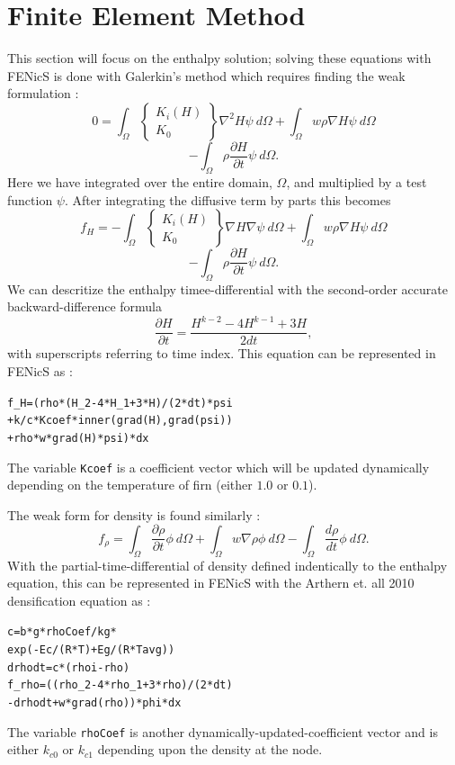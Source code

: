 \documentclass{article}%
\begin{document}
\section{Finite Element Method}

This section will focus on the enthalpy solution; solving these equations with FENicS is done with Galerkin's method which requires finding the weak formulation :
  $$
    0 =
    \int_{\Omega} 
      \begin{Bmatrix}
        K_i(H)\\
        K_0
      \end{Bmatrix}
      \nabla^2 H \psi\ d \Omega 
    + \int_{\Omega}w \rho \nabla H \psi\ d \Omega
  $$
  $$
    - \int_{\Omega} {\rho \frac{\partial H}{\partial t}} \psi\ d \Omega.
  $$
Here we have integrated over the entire domain, $\Omega$, and multiplied by a test function $\psi$.  After integrating the diffusive term by parts this becomes
  $$
    f_H =
    - \int_{\Omega} 
        \begin{Bmatrix}
          K_i(H)\\
          K_0
        \end{Bmatrix}
        \nabla H \nabla \psi\ d \Omega 
    + \int_{\Omega}w \rho \nabla H \psi\ d \Omega
  $$
  $$
    - \int_{\Omega} {\rho \frac{\partial H}{\partial t}} \psi\ d \Omega.
  $$
We can descritize the enthalpy timee-differential with the second-order accurate backward-difference formula
  $$\frac{\partial H}{\partial t} = \frac{H^{k-2} - 4H^{k-1} + 3H}{2dt},$$
with superscripts referring to time index.  This equation can be represented in FENicS as :
\small
\begin{alltt}
f_H = (rho*(H_2 - 4*H_1 + 3*H)/(2*dt)*psi 
      + k/c*Kcoef*inner(grad(H), grad(psi))
      + rho*w*grad(H)*psi)*dx
\end{alltt}
\normalsize
The variable \texttt{Kcoef} is a coefficient vector which will be updated dynamically depending on the temperature of firn (either $1.0$ or $0.1$).

The weak form for density is found similarly :
  $$
  f_{\rho} = 
    \int_{\Omega} \frac{\partial \rho}{\partial t}\phi\ d \Omega + 
    \int_{\Omega} w\nabla \rho \phi\ d \Omega -
    \int_{\Omega}\frac{d \rho}{dt}\phi\ d \Omega.
  $$
With the partial-time-differential of density defined indentically to the enthalpy equation, this can be represented in FENicS with the Arthern et. all 2010 densification equation as :
\small
\begin{alltt}
c      = b*g*rhoCoef/kg * 
         exp(-Ec/(R*T) + Eg/(R*Tavg))
drhodt = c*(rhoi - rho)
f_rho  = ((rho_2 - 4*rho_1 + 3*rho)/(2*dt) 
         - drhodt + w*grad(rho))*phi*dx 
\end{alltt}
\normalsize
The variable \texttt{rhoCoef} is another dynamically-updated-coefficient vector and is either $k_{c0}$ or $k_{c1}$ depending upon the density at the node.
\end{document}
